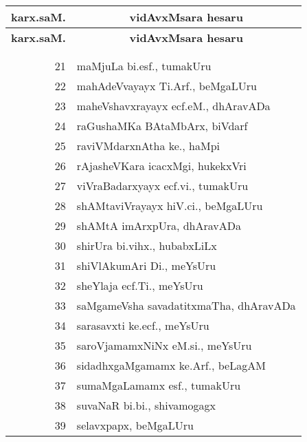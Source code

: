 \begin{center}
\qquad\quad
\begin{minipage}[t]{7cm}
{\renewcommand{\arraystretch}{1.5}
\begin{longtable}{rl}
\hline
{\bf karx.saM.} & \multicolumn{1}{c}{\bf vidAvxMsara hesaru}\\[3pt]
\hline
\endfirsthead
\hline
{\bf karx.saM.} & \multicolumn{1}{c}{\bf vidAvxMsara hesaru}\\[3pt]
\hline
  & \\[-10pt]
\endhead
\endfoot
\endlastfoot
  & \\[-10pt]
21 & maMjuLa bi.esf., tumakUru\\
22 & mahAdeVvayayx Ti.Arf., beMgaLUru\\
23 & maheVshavxrayayx ecf.eM., dhAravADa\\
24 & raGushaMKa BAtaMbArx, biVdarf\\
25 & raviVMdarxnAtha ke., haMpi\\
26 & rAjasheVKara icacxMgi, hukekxVri\\
27 & viVraBadarxyayx ecf.vi., tumakUru\\
28 & shAMtaviVrayayx hiV.ci., beMgaLUru\\
29 & shAMtA imArxpUra, dhAravADa\\
30 & shirUra bi.vihx., hubabxLiLx\\
31 & shiVlAkumAri Di., meYsUru\\
32 & sheYlaja ecf.Ti., meYsUru\\
33 & saMgameVsha savadatitxmaTha, dhAravADa\\
34 & sarasavxti ke.ecf., meYsUru\\
35 & saroVjamamxNiNx eM.si., meYsUru\\
36 & sidadhxgaMgamamx ke.Arf., beLagAM\\
37 & sumaMgaLamamx esf., tumakUru\\
38 & suvaNaR bi.bi., shivamogagx\\
39 &  selavxpapx, beMgaLUru\\
\end{longtable}}
\end{minipage}
\end{center}
